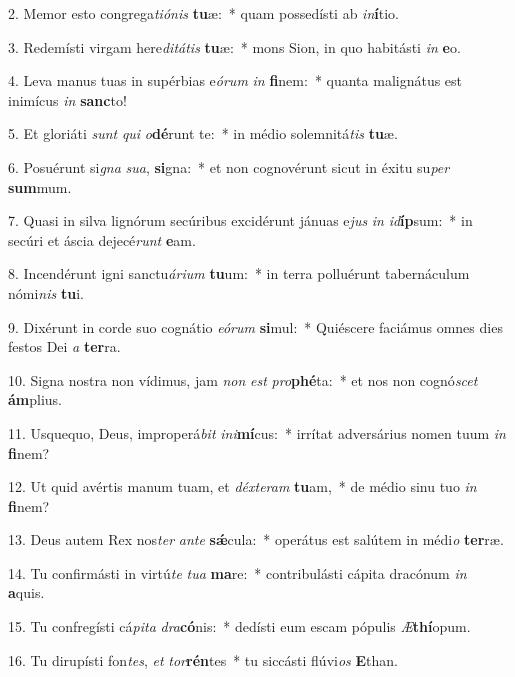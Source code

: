 2. Memor esto congrega\textit{ti}\textit{ó}\textit{nis} \textbf{tu}æ:~*  quam possedísti ab \textit{in}\textbf{í}tio.\

3. Redemísti virgam here\textit{di}\textit{tá}\textit{tis} \textbf{tu}æ:~*  mons Sion, in quo habitásti \textit{in} \textbf{e}o.\

4. Leva manus tuas in supérbias e\textit{ó}\textit{rum} \textit{in} \textbf{fi}nem:~*  quanta malignátus est inimícus \textit{in} \textbf{sanc}to!\

5. Et gloriáti \textit{sunt} \textit{qui} \textit{o}\textbf{dé}runt te:~*  in médio solemnitá\textit{tis} \textbf{tu}æ.\

6. Posuérunt si\textit{gna} \textit{su}\textit{a}, \textbf{si}gna:~*  et non cognovérunt sicut in éxitu su\textit{per} \textbf{sum}mum.\

7. Quasi in silva lignórum secúribus excidérunt jánuas e\textit{jus} \textit{in} \textit{id}\textbf{íp}sum:~*  in secúri et áscia dejecé\textit{runt} \textbf{e}am.\

8. Incendérunt igni sanctu\textit{á}\textit{ri}\textit{um} \textbf{tu}um:~*  in terra polluérunt tabernáculum nómi\textit{nis} \textbf{tu}i.\

9. Dixérunt in corde suo cognátio \textit{e}\textit{ó}\textit{rum} \textbf{si}mul:~*  Quiéscere faciámus omnes dies festos Dei \textit{a} \textbf{ter}ra.\

10. Signa nostra non vídimus, jam \textit{non} \textit{est} \textit{pro}\textbf{phé}ta:~*  et nos non cognó\textit{scet} \textbf{ám}plius.\

11. Usquequo, Deus, improperá\textit{bit} \textit{in}\textit{i}\textbf{mí}cus:~*  irrítat adversárius nomen tuum \textit{in} \textbf{fi}nem?\

12. Ut quid avértis manum tuam, et \textit{déx}\textit{te}\textit{ram} \textbf{tu}am,~*  de médio sinu tuo \textit{in} \textbf{fi}nem?\

13. Deus autem Rex nos\textit{ter} \textit{an}\textit{te} \textbf{sǽ}cula:~*  operátus est salútem in médi\textit{o} \textbf{ter}ræ.\

14. Tu confirmásti in virtú\textit{te} \textit{tu}\textit{a} \textbf{ma}re:~*  contribulásti cápita dracónum \textit{in} \textbf{a}quis.\

15. Tu confregísti cá\textit{pi}\textit{ta} \textit{dra}\textbf{có}nis:~*  dedísti eum escam pópulis \textit{Æ}\textbf{thí}opum.\

16. Tu dirupísti fon\textit{tes}, \textit{et} \textit{tor}\textbf{rén}tes~*  tu siccásti flúvi\textit{os} \textbf{E}than.\

